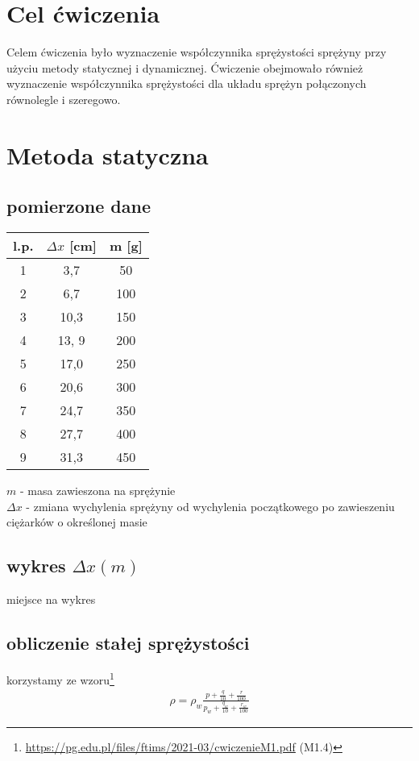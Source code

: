 \documentclass{article}
\begin{document}
\section{Cel ćwiczenia}
Celem ćwiczenia było wyznaczenie współczynnika sprężystości sprężyny przy użyciu metody statycznej i dynamicznej.  Ćwiczenie obejmowało również wyznaczenie współczynnika sprężystości dla układu sprężyn połączonych równolegle i szeregowo.

\section{Metoda statyczna}
\subsection{pomierzone dane}
\begin{center}
\begin{tabular}{ c | c | c }
l.p. & $\Delta x$ [cm] & m [g]\\
\hline
 1 & 3,7   & 50\\ 
 2 & 6,7   & 100\\ 
 3 & 10,3 & 150\\ 
 4 & 13, 9 & 200 \\
 5 & 17,0  & 250 \\
 6 & 20,6 & 300 \\
 7 & 24,7 & 350 \\
 8 & 27,7 & 400 \\
 9 & 31,3 & 450

\end{tabular}
\end{center}
$m$ - masa zawieszona na sprężynie \\
$\Delta x$ - zmiana wychylenia sprężyny od wychylenia początkowego po zawieszeniu ciężarków o określonej masie

\subsection{wykres $\Delta x(m)$}
miejsce na wykres

\subsection{obliczenie stałej sprężystości}
korzystamy ze wzoru\footnote{\url{https://pg.edu.pl/files/ftims/2021-03/cwiczenieM1.pdf} (M1.4)}
\begin{gather*}
	\rho = \rho_w \frac{p+\frac{q}{10} + \frac{r}{100}}{p_w+\frac{q_w}{10} + \frac{r_w}{100}}
\end{gather*} 
\end{document}
